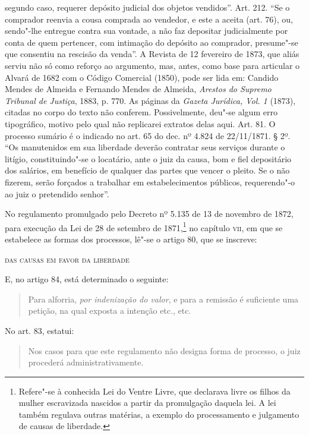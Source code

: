{  segundo caso, requerer depósito judicial dos objetos vendidos''. Art.
  212. ``Se o comprador reenvia a cousa comprada ao vendedor, e este a
  aceita (art. 76), ou, sendo"-lhe entregue contra sua vontade, a não faz
  depositar judicialmente por conta de quem pertencer, com intimação do
  depósito ao comprador, presume"-se que consentiu na rescisão da venda''.
  A Revista de 12 fevereiro de 1873, que aliás serviu não só como
  reforço ao argumento, mas, antes, como base para articular o
  Alvará de 1682 com o Código Comercial (1850), pode ser lida em: 
 Candido Mendes de Almeida e Fernando Mendes de Almeida,
 \emph{Arestos do Supremo Tribunal de Justiça}, 1883, p. 770. As páginas da
  \emph{Gazeta Jurídica, Vol. 1} (1873), citadas no corpo do texto não
  conferem. Possivelmente, deu"-se algum erro tipográfico, motivo pelo
  qual não replicarei extratos delas aqui. Art. 81. O processo sumário é
  o indicado no art. 65 do dec. nº 4.824 de 22/11/1871. § 2º. ``Os
  manutenidos em sua liberdade deverão contratar seus serviços durante o
  litígio, constituindo"-se o locatário, ante o juiz da causa, bom e fiel
  depositário dos salários, em benefício de qualquer das partes que
  vencer o pleito. Se o não fizerem, serão forçados a trabalhar em
  estabelecimentos públicos, requerendo"-o ao juiz o pretendido senhor''.}

No regulamento promulgado pelo Decreto nº 5.135 de 13 de novembro de
1872, para execução da Lei de 28 de setembro de 1871,\footnote{
  Refere"-se à conhecida Lei do Ventre Livre, que declarava livre os
  filhos da mulher escravizada nascidos a partir da promulgação daquela
  lei. A lei também regulava outras matérias, a exemplo do processamento
  e julgamento de causas de liberdade.} no capítulo \textsc{vii}, em que se
estabelece as formas dos processos, lê"-se o artigo 80, que se inscreve:

\textsc{das causas em favor da liberdade}

E, no artigo 84, está determinado o seguinte:

\begin{quote}
Para alforria, \emph{por indenização do valor}, e para a remissão é
suficiente uma petição, na qual exposta a intenção etc., etc.
\end{quote}

No art. 83, estatui:

\begin{quote}
Nos casos para que este regulamento não designa forma de processo, o
juiz procederá administrativamente.
\end{quote}


